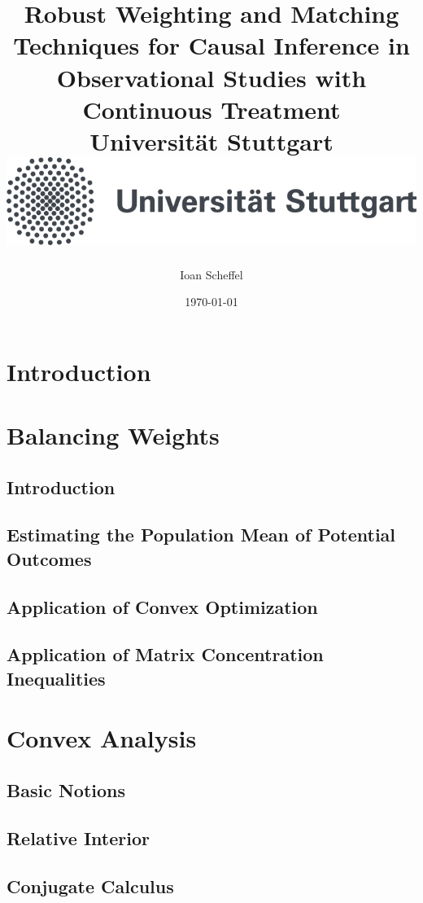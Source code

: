 \documentclass[12pt]{scrreport}
\title{
  {
    Robust Weighting and Matching Techniques for Causal Inference in Observational Studies with Continuous Treatment
  }
  \\
  {\large Universität Stuttgart}
  \\
  {\includegraphics{unistuttgart_logo_deutsch.jpg}}
}
\author{Ioan Scheffel}
\date{\today}
\begin{document}
\maketitle

\tableofcontents 

\chapter{Introduction}
%

\chapter{Balancing Weights}
  \section{Introduction}
  \section{Estimating the Population Mean of Potential Outcomes}
  \section{Application of Convex Optimization}
  
  \section{Application of Matrix Concentration Inequalities}
\chapter{Convex Analysis}
  \section{Basic Notions}
  \section{Relative Interior}
  \section{Conjugate Calculus}
%
\end{document}
